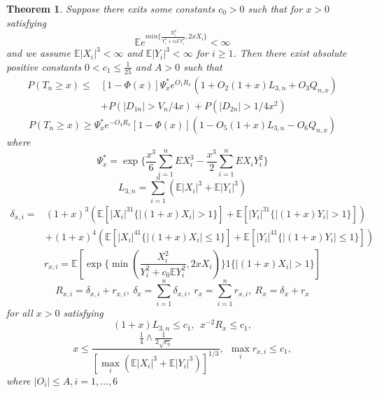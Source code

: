 \documentclass[bj,authoryear]{imsart}
\numberwithin{equation}{section}
\theoremstyle{plain}
\newtheorem{theo}{Theorem}[section]
\theoremstyle{definition}
\begin{document}
\begin{theo}\label{theo-cramer-moderate-deviation-for-general-self-norm-non-linear}
  Suppose there exits some constants $c_0>0$ such that for $x>0$ satisfying $$\mathbb{E} e^{min\{\frac{X_i^2}{Y_i^2+c_0\mathbb{E} Y_i^2},2xX_i\}}<\infty$$ and we assume $\mathbb{E} |X_i|^3<\infty$ and $\mathbb{E} |Y_i|^3<\infty$ for $i\geq 1$. Then there exist absolute positive constants $0<c_1\leq \frac{1}{25}$ and $A>0$ such that
  \begin{equation}
    \begin{aligned}
      P(T_n\geq x)\leq&[1-\Phi(x)]\Psi_{x}^{*}e^{O_1R_x}(1+O_2(1+x)L_{3,n}+O_3Q_{n,x})\\
      &+P(|D_{1n}|> V_n/4x)+P(|D_{2n}|>1/4x^2)
    \end{aligned}
  \end{equation}
  \begin{equation}
    P(T_n\geq x)\geq \Psi_{x}^{*}e^{-O_4R_x}[1-\Phi(x)](1-O_5(1+x)L_{3,n}-O_6Q_{n,x})
  \end{equation}
  where
  $$\Psi_{x}^{*} = \exp\{\frac{x^3}{6}\sum_{i=1}^{n}EX_i^3-\frac{x^3}{2}\sum_{i=1}^{n}EX_iY_i^2\}$$
  $$L_{3,n} = \sum_{i=1}^{n}(\mathbb{E} |X_i|^3+\mathbb{E}|Y_i|^3)$$
  \begin{equation}
    \begin{aligned}
      \delta_{x,i} =& (1+x)^3\left(\mathbb{E} [|X_i|^31\{|(1+x)X_i|>1\}]+\mathbb{E} [|Y_i|^31\{|(1+x)Y_i|>1\}]\right)\\
      &+(1+x)^4\left(\mathbb{E} [|X_i|^41\{|(1+x)X_i|\leq1\}]+\mathbb{E} [|Y_i|^41\{|(1+x)Y_i|\leq1\}]\right)
    \end{aligned}
  \end{equation}
  $$r_{x,i} = \mathbb{E}[\exp\{\min(\frac{X_i^2}{Y_i^2+c_0\mathbb{E} Y_i^2},2xX_i)\}1\{|(1+x)X_i|>1\}]$$
  $$R_{x,i} = \delta_{x,i}+r_{x,i}, \ \delta_x = \sum_{i=1}^{n}\delta_{x,i},\ r_x = \sum_{i=1}^{n}r_{x,i},\ R_x = \delta_x+r_x$$
  for all $x>0$ satisfying 
  \begin{equation}
    (1+x)L_{3,n}\leq c_1,\ \ x^{-2}R_x\leq c_1,\label{L3n-and-Rx-bound}
  \end{equation}
  \begin{equation}
    x\leq \frac{\frac{1}{4}\land \frac{1}{2\sqrt{c_0}}}{[\max_i(\mathbb{E} |X_i|^3+\mathbb{E} |Y_i|^3)]^{1/3}}, \ \ \max_ir_{x,i}\leq c_1,\label{x-and-rxi-bound}
  \end{equation}
  where $|O_i|\leq A, i=1,\dots,6$
\end{theo}
\end{document}
